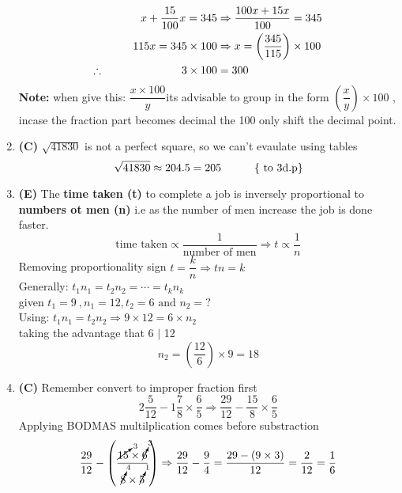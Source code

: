 \begin{multicols}{2}
\begin{enumerate}[label={\textbf{\arabic*.}}]
    \begin{align*}
    x + \dfrac{15}{100}x = 345 &\Rightarrow \dfrac{100x + 15x}{100} = 345 \\
    115x = 345 \times 100 &\Rightarrow x = \left(\frac{345}{115}\right) \times 100 \\
    \therefore \hspace{70px} 3 \times 100 &= 300 \\
    \end{align*}
    \textbf{Note:} when give this: \( \dfrac{x \times 100}{y}\)its advisable to group in the form
    \(\left(\dfrac{x}{y}\right) \times 100\) , incase the fraction part becomes decimal the 100 only shift the
    decimal point. 

    \item \textbf{(C) } $ \sqrt{41830}$ is not a perfect square, so we can't evaulate using tables
    \[ \sqrt{41830} \approx 204.5 = 205 \hspace{30px} \text{\{ to 3d.p\}}\]
    \item \textbf{(E)} The \textbf{time taken (t)} to complete a job is inversely proportional to \textbf{numbers ot men (n)} 
    i.e as the number of men increase the job is done faster. 
        \begin{equation}
            \text{time taken} \propto \dfrac{1}{\text{number of men}} \Rightarrow t \propto \dfrac{1}{n} 
        \end{equation}
    Removing proportionality sign
    \(t = \dfrac{k}{n} \Rightarrow tn = k\) \\
    Generally:  \hspace{10px}\(t_{1}n_{1} = t_{2}n_2 = \cdots = t_{k}n_{k}\)\\
    given \(t_{1} = 9\ , n_{1} = 12 , t_{2} = 6 \text{ and } n_{2} = ?\) \\
    Using: \(t_{1}n_{1} = t_{2}n_{2} \Rightarrow 9 \times 12 = 6 \times n_{2}\) \\
    taking the advantage that 6 $\mid$ 12 
    \[n_{2} = \left(\frac{12}{6}\right) \times 9 = 18\]

    \item \textbf{(C)} Remember convert to improper fraction first
    \[2\frac{5}{12} - 1\frac{7}{8} \times \frac{6}{5} \Rightarrow \frac{29}{12} - \frac{15}{8} \times \frac{6}{5}\]
    Applying BODMAS multilplication comes before substraction\\
    \[\dfrac{29}{12} - \left(\dfrac{\cancelto{3}{15} \times \cancelto{3}{6}}{\cancelto{4}{8} \times \cancelto{1}{5}}\right) \Rightarrow \dfrac{29}{12} - \dfrac{9}{4} = \dfrac{29 - (9 \times 3)}{12} = \frac{2}{12} = \frac{1}{6}\]


\end{enumerate}
\end{multicols}
